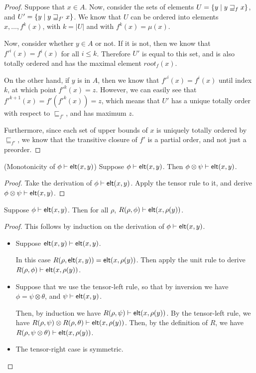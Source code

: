 \begin{proof}
Suppose that $x \in A$. Now, consider the sets of elements $U =
\{{{y}\;|\;{y \sqsupseteq_f x}}\}$, and $U' = \{{{y}\;|\;{y
  \sqsupseteq_{f'} x}}\}$. We know that $U$ can be ordered into elements
$x, \ldots, f^k(x)$, with $k = |U|$ and with $f^k(x) = \mu(x)$. 

Now, consider whether $y \in A$ or not. If it is not, then we know
that $f'^{i}(x) = f^{i}(x)$ for all $i \leq k$. Therefore $U'$ is
equal to this set, and is also totally ordered and has the maximal
element $\mathit{root}_f(x)$. 

On the other hand, if $y$ is in $A$, then we know that $f'^i(x) =
f^i(x)$ until index $k$, at which point $f'^k(x) = z$. However, we can
easily see that $f'^{k+1}(x) = f'(f'^k(x)) = z$, which means that $U'$
has a unique totally order with respect to $\sqsubseteq_{f'}$, and has
maximum $z$. 

Furthermore, since each set of upper bounds of $x$ is uniquely totally
ordered by $\sqsubseteq_{f'}$, we know that the transitive closure of
$f'$ is a partial order, and not just a preorder. 
\end{proof}


\begin{lemma}{(Monotonicity of ${\phi} \vdash \mathsf{elt}({x}, {y})$)}
Suppose ${\phi} \vdash \mathsf{elt}({x}, {y})$. Then ${\phi \otimes \psi} \vdash \mathsf{elt}({x}, {y})$. 
\end{lemma}

\begin{proof}
Take the derivation of ${\phi} \vdash \mathsf{elt}({x}, {y})$. Apply the tensor rule 
to it, and derive ${\phi \otimes \psi} \vdash \mathsf{elt}({x}, {y})$.
\end{proof}

\begin{lemma}
  Suppose ${\phi} \vdash \mathsf{elt}({x}, {y})$. Then for all $\rho$, ${R(\rho, \phi)} \vdash \mathsf{elt}({x}, {\rho(y)})$. 
\end{lemma}

\begin{proof}
This follows by induction on the derivation of ${\phi} \vdash \mathsf{elt}({x}, {y})$. 
\begin{itemize}
\item Suppose ${\mathsf{elt}({x}, {y})} \vdash \mathsf{elt}({x}, {y})$. 

In this case $R(\rho, \mathsf{elt}({x}, {y})) = \mathsf{elt}({x}, {\rho(y)})$. Then apply the 
unit rule to derive ${R(\rho, \phi)} \vdash \mathsf{elt}({x}, {\rho(y)})$. 

\item Suppose that we use the tensor-left rule, so that by inversion we have
$\phi = \psi \otimes \theta$, and ${\psi} \vdash \mathsf{elt}({x}, {y})$. 

Then, by induction we have ${R(\rho, \psi)} \vdash \mathsf{elt}({x}, {\rho(y)})$. 
By the tensor-left rule, we have ${R(\rho, \psi) \otimes R(\rho, \theta)} \vdash \mathsf{elt}({x}, {\rho(y)})$. Then, by the definition of $R$, we have ${R(\rho, \psi \otimes \theta)} \vdash \mathsf{elt}({x}, {\rho(y)})$.

\item The tensor-right case is symmetric. 
\end{itemize}
\end{proof}

